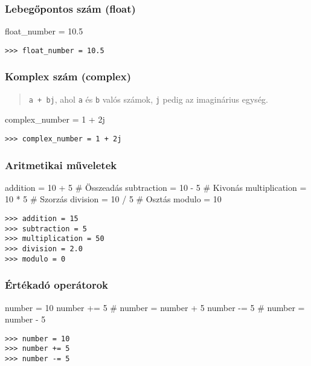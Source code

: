 \subsubsection{Lebegőpontos szám (float)}
\begin{pycode}
    float_number = 10.5
\end{pycode}

\begin{verbatim}
>>> float_number = 10.5
\end{verbatim}

\subsubsection{Komplex szám (complex)}
\begin{quote}
    \texttt{a + bj}, ahol \texttt{a} és \texttt{b} valós számok, \texttt{j} pedig az imaginárius egység.
\end{quote}
\begin{pycode}
    complex_number = 1 + 2j
\end{pycode}
\begin{verbatim}
>>> complex_number = 1 + 2j
\end{verbatim}

\subsubsection{Aritmetikai műveletek}
\begin{pycode}
    addition = 10 + 5 # Összeadás
    subtraction = 10 - 5 # Kivonás
    multiplication = 10 * 5 # Szorzás
    division = 10 / 5 # Osztás
    modulo = 10 %
\end{pycode}
\begin{verbatim}
>>> addition = 15
>>> subtraction = 5
>>> multiplication = 50
>>> division = 2.0
>>> modulo = 0
\end{verbatim}

\subsubsection{Értékadó operátorok}
\begin{pycode}
    number = 10
    number += 5 # number = number + 5
    number -= 5 # number = number - 5
\end{pycode}
\begin{verbatim}
>>> number = 10
>>> number += 5
>>> number -= 5
\end{verbatim}

